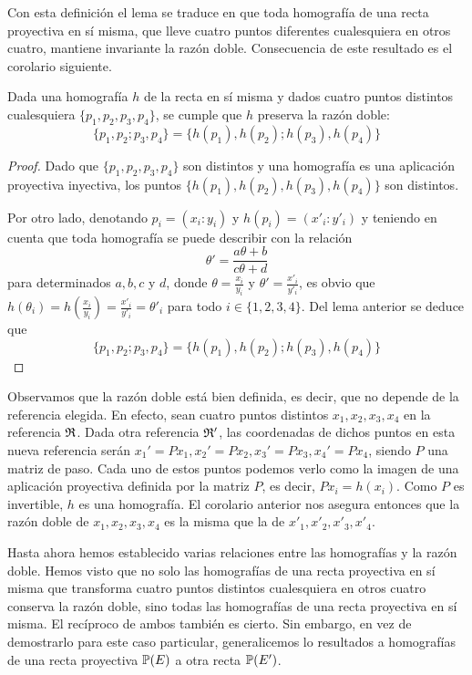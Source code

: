 Con esta definición el lema se traduce en que toda homografía de una recta proyectiva en sí misma, que lleve cuatro puntos diferentes cualesquiera en otros cuatro, mantiene invariante la razón doble. Consecuencia de este resultado es el corolario siguiente.
\begin{cor}
	Dada una homografía $h$ de la recta en sí misma y dados cuatro puntos distintos cualesquiera $\{p_1,p_2,p_3,p_4\}$, se cumple que $h$ preserva la razón doble:
	\begin{equation}
	\{p_1,p_2;p_3,p_4\}=\{h(p_1),h(p_2);h(p_3),h(p_4)\}
	\end{equation} 
\end{cor}
\begin{proof}
	Dado que $\{p_1,p_2,p_3,p_4\}$ son distintos y una homografía es una aplicación proyectiva inyectiva, los puntos $\{h(p_1),h(p_2),h(p_3),h(p_4)\}$ son distintos.
	
	Por otro lado, denotando $p_i=(x_i:y_i)$ y $h(p_i)=(x'_i:y'_i)$ y teniendo en cuenta que toda homografía se puede describir con la relación
	\begin{equation*}
		\theta'=\frac{a\theta+b}{c\theta +d}
	\end{equation*}
	para determinados $a,b,c$ y $d$, donde $\theta=\frac{x_i}{y_i}$ y $\theta'=\frac{x'_i}{y'_i}$, es obvio que $h(\theta_i)=h(\frac{x_i}{y_i})=\frac{x'_i}{y'_i}=\theta'_i$ para todo $i\in\{1,2,3,4\}$. Del lema anterior se deduce que
	\begin{equation*}
		\{p_1,p_2;p_3,p_4\}=\{h(p_1),h(p_2);h(p_3),h(p_4)\}
	\end{equation*}
\end{proof}
\begin{obs}
	Observamos que la razón doble está bien definida, es decir, que no depende de la referencia elegida. En efecto, sean cuatro puntos distintos $x_1,x_2,x_3,x_4$ en la referencia $\mathfrak{R}$. Dada otra referencia $\mathfrak{R}'$, las coordenadas de dichos puntos en esta nueva referencia serán $x_1'=Px_1,x_2'=Px_2,x_3'=Px_3,x_4'=Px_4$, siendo $P$ una matriz de paso. Cada uno de estos puntos podemos verlo como la imagen de una aplicación proyectiva definida por la matriz $P$, es decir, $Px_i=h(x_i)$. Como $P$ es invertible, $h$ es una homografía. El corolario anterior nos asegura entonces que la razón doble de $x_1,x_2,x_3,x_4$ es la misma que la de $x'_1,x'_2,x'_3,x'_4$.
\end{obs}
Hasta ahora hemos establecido varias relaciones entre las homografías y la razón doble. Hemos visto que no solo las homografías de una recta proyectiva en sí misma que transforma cuatro puntos distintos cualesquiera en otros cuatro conserva la razón doble, sino todas las homografías de una recta proyectiva en sí misma. El recíproco de ambos también es cierto. Sin embargo, en vez de demostrarlo para este caso particular, generalicemos lo resultados a homografías de una recta proyectiva $\mathbb{P}(E)$ a otra recta $\mathbb{P}(E')$.


